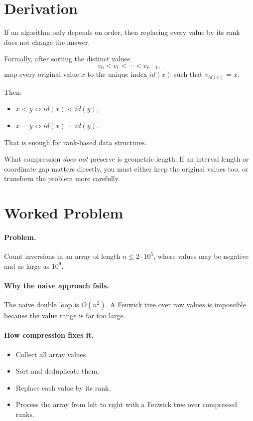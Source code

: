 \section*{Derivation}

If an algorithm only depends on order, then replacing every value by its rank does not change the answer.

Formally, after sorting the distinct values
\[
v_0 < v_1 < \cdots < v_{k-1},
\]
map every original value \(x\) to the unique index \(id(x)\) such that \(v_{id(x)} = x\).

Then:

\begin{itemize}
  \item \(x < y \iff id(x) < id(y)\),
  \item \(x = y \iff id(x) = id(y)\).
\end{itemize}

That is enough for rank-based data structures.

What compression \emph{does not} preserve is geometric length. If an interval length or coordinate gap matters directly,
you must either keep the original values too, or transform the problem more carefully.

\section*{Worked Problem}

\paragraph{Problem.}
Count inversions in an array of length \(n \le 2 \cdot 10^5\), where values may be negative and as large as \(10^9\).

\paragraph{Why the naive approach fails.}
The naive double loop is \(O(n^2)\). A Fenwick tree over raw values is impossible because the value range is far too
large.

\paragraph{How compression fixes it.}

\begin{itemize}
  \item Collect all array values.
  \item Sort and deduplicate them.
  \item Replace each value by its rank.
  \item Process the array from left to right with a Fenwick tree over compressed ranks.
\end{itemize}

